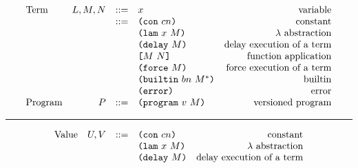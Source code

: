 \documentclass[../plutus-core-specification.tex]{subfiles}
\begin{document}
\begin{minipage}{\linewidth}
    \centering
    \[\begin{array}{lrclr}
    \textrm{Term}       & L,M,N  & ::= & x                          & \textrm{variable}\\
                        &        & ::= & \texttt{(} \texttt{con} ~ cn \texttt{)}                   & \textrm{constant}\\
                        &        &     & \texttt{(} \texttt{lam} ~ x ~ M  \texttt{)}                & \textrm{$\lambda$ abstraction}\\
                        &        &     & \texttt{(} \texttt{delay} ~ M \texttt{)}                  & \textrm{delay execution of a term}\\
                        &        &     & \texttt{[} M ~ N \texttt{]}                & \textrm{function application}\\
                        &        &     & \texttt{(} \texttt{force} ~ M \texttt{)}                  & \textrm{force execution of a term}\\
                        &        &     & \texttt{(} \texttt{builtin} ~ bn ~ M^* \texttt{)}         & \textrm{builtin}\\
                        &        &     & \texttt{(} \texttt{error} \texttt{)}                    & \textrm{error}\\
        \textrm{Program}& P      & ::= & \texttt{(} \texttt{program} ~ v ~ M \texttt{)}             & \textrm{versioned program}\\

    \end{array}\]
    \label{fig:untyped-grammar}
\end{minipage}

\medskip\hrule\medskip

\begin{minipage}{\linewidth}
    \centering
    \[\begin{array}{lrclr}
        \textrm{Value}  & U, V   & ::= & \texttt{(} \texttt{con} ~ cn \texttt{)}                   & \textrm{constant}\\
                        &        &     & \texttt{(} \texttt{lam} ~ x ~ M  \texttt{)}                & \textrm{$\lambda$ abstraction}\\
                        &        &     & \texttt{(} \texttt{delay} ~ M \texttt{)}                  & \textrm{delay execution of a term}\\
    \end{array}\]
    \label{fig:untyped-values}
\end{minipage}
\end{document}
